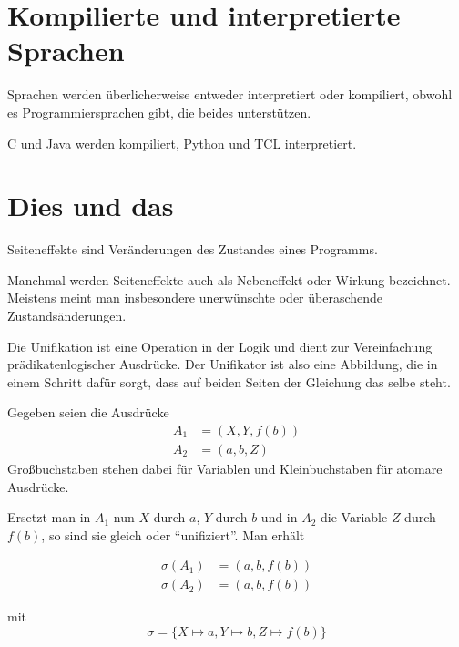 \section{Kompilierte und interpretierte Sprachen}
Sprachen werden überlicherweise entweder interpretiert oder kompiliert,
obwohl es Programmiersprachen gibt, die beides unterstützen.

C und Java werden kompiliert, Python und TCL interpretiert.

\section{Dies und das}
\begin{definition}[Seiteneffekt]%
    Seiteneffekte sind Veränderungen des Zustandes eines Programms.
\end{definition}

Manchmal werden Seiteneffekte auch als Nebeneffekt oder Wirkung bezeichnet.
Meistens meint man insbesondere unerwünschte oder überaschende Zustandsänderungen.

\begin{definition}[Unifikation]%
    Die Unifikation ist eine Operation in der Logik und dient zur Vereinfachung
    prädikatenlogischer Ausdrücke.
    Der Unifikator ist also eine Abbildung, die in einem Schritt dafür sorgt, dass
    auf beiden Seiten der Gleichung das selbe steht.
\end{definition}

\begin{beispiel}
    Gegeben seien die Ausdrücke
    \begin{align*}
        A_1 &= \left(X, Y, f(b) \right)\\
        A_2 &= \left(a, b, Z \right)
    \end{align*}
    Großbuchstaben stehen dabei für Variablen und Kleinbuchstaben für atomare
    Ausdrücke.

    Ersetzt man in $A_1$ nun $X$ durch $a$, $Y$ durch $b$ und in $A_2$
    die Variable $Z$ durch $f\left(b\right)$, so sind sie gleich oder
    \enquote{unifiziert}. Man erhält

    \begin{align*}
        \sigma(A_1) &= \left(a, b, f(b) \right)\\
        \sigma(A_2) &= \left(a, b, f(b) \right)
    \end{align*}

    mit
    \[\sigma = \{X \mapsto a, Y \mapsto b, Z \mapsto f(b)\}\]
\end{beispiel}

